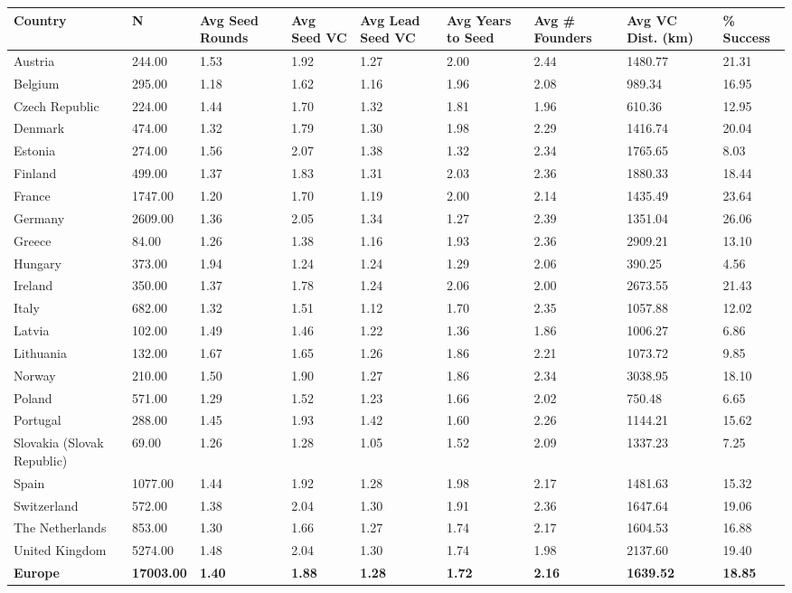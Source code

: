 \begin{table}[ht]
\centering
\begin{tabular}{lllllllll}
  \toprule
Country & N & Avg Seed Rounds & Avg Seed VC & Avg Lead Seed VC & Avg Years to Seed & Avg \# Founders & Avg VC Dist. (km) & \% Success \\ 
  \midrule
Austria & 244.00 & 1.53 & 1.92 & 1.27 & 2.00 & 2.44 & 1480.77 & 21.31 \\ 
  Belgium & 295.00 & 1.18 & 1.62 & 1.16 & 1.96 & 2.08 & 989.34 & 16.95 \\ 
  Czech Republic & 224.00 & 1.44 & 1.70 & 1.32 & 1.81 & 1.96 & 610.36 & 12.95 \\ 
  Denmark & 474.00 & 1.32 & 1.79 & 1.30 & 1.98 & 2.29 & 1416.74 & 20.04 \\ 
  Estonia & 274.00 & 1.56 & 2.07 & 1.38 & 1.32 & 2.34 & 1765.65 & 8.03 \\ 
  Finland & 499.00 & 1.37 & 1.83 & 1.31 & 2.03 & 2.36 & 1880.33 & 18.44 \\ 
  France & 1747.00 & 1.20 & 1.70 & 1.19 & 2.00 & 2.14 & 1435.49 & 23.64 \\ 
  Germany & 2609.00 & 1.36 & 2.05 & 1.34 & 1.27 & 2.39 & 1351.04 & 26.06 \\ 
  Greece & 84.00 & 1.26 & 1.38 & 1.16 & 1.93 & 2.36 & 2909.21 & 13.10 \\ 
  Hungary & 373.00 & 1.94 & 1.24 & 1.24 & 1.29 & 2.06 & 390.25 & 4.56 \\ 
  Ireland & 350.00 & 1.37 & 1.78 & 1.24 & 2.06 & 2.00 & 2673.55 & 21.43 \\ 
  Italy & 682.00 & 1.32 & 1.51 & 1.12 & 1.70 & 2.35 & 1057.88 & 12.02 \\ 
  Latvia & 102.00 & 1.49 & 1.46 & 1.22 & 1.36 & 1.86 & 1006.27 & 6.86 \\ 
  Lithuania & 132.00 & 1.67 & 1.65 & 1.26 & 1.86 & 2.21 & 1073.72 & 9.85 \\ 
  Norway & 210.00 & 1.50 & 1.90 & 1.27 & 1.86 & 2.34 & 3038.95 & 18.10 \\ 
  Poland & 571.00 & 1.29 & 1.52 & 1.23 & 1.66 & 2.02 & 750.48 & 6.65 \\ 
  Portugal & 288.00 & 1.45 & 1.93 & 1.42 & 1.60 & 2.26 & 1144.21 & 15.62 \\ 
  Slovakia (Slovak Republic) & 69.00 & 1.26 & 1.28 & 1.05 & 1.52 & 2.09 & 1337.23 & 7.25 \\ 
  Spain & 1077.00 & 1.44 & 1.92 & 1.28 & 1.98 & 2.17 & 1481.63 & 15.32 \\ 
  Switzerland & 572.00 & 1.38 & 2.04 & 1.30 & 1.91 & 2.36 & 1647.64 & 19.06 \\ 
  The Netherlands & 853.00 & 1.30 & 1.66 & 1.27 & 1.74 & 2.17 & 1604.53 & 16.88 \\ 
  United Kingdom & 5274.00 & 1.48 & 2.04 & 1.30 & 1.74 & 1.98 & 2137.60 & 19.40 \\ 
  \textbf{Europe} & \textbf{17003.00} & \textbf{1.40} & \textbf{1.88} & \textbf{1.28} & \textbf{1.72} & \textbf{2.16} & \textbf{1639.52} & \textbf{18.85} \\ 
   \bottomrule
\end{tabular}
\label{tab:seed_summary_clean}
\end{table}
